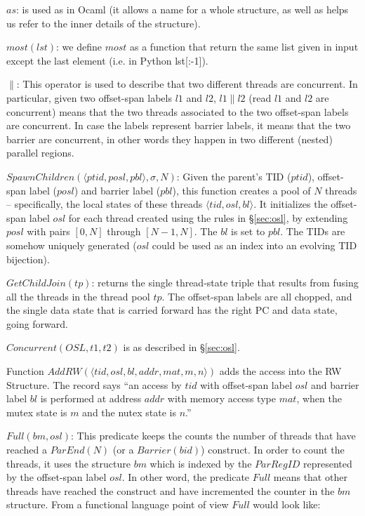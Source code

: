 \begin{compactitem}
\item $as$: is used as in Ocaml (it allows a name for a whole structure, as
  well as helps us refer to the inner details of the structure).
\item $most(lst)$: we define $most$ as a function that return the same list
  given in input except the last element (i.e. in Python lst[:-1]).
\item $\parallel$: This operator is used to describe that two different
  threads are concurrent.
  In particular, given two offset-span labels $l1$ and $l2$, $l1 \parallel l2$
  (read $l1$ and $l2$ are concurrent) means that the two threads associated to
  the two offset-span labels are concurrent.
  In case the labels represent barrier labels, it means that the two barrier
  are concurrent, in other words they happen in two different (nested)
  parallel regions.
\item $SpawnChildren(\langle ptid, posl, pbl \rangle, \sigma, N)$: Given the
  parent's TID ($ptid$), offset-span label ($posl$) and barrier label ($pbl$),
  this function creates a pool of $N$ threads -- specifically, the local
  states of these threads $\langle tid, osl, bl \rangle$.
  It initializes the offset-span label $osl$ for each thread created using the
  rules in \S\ref{sec:osl}, by extending $posl$ with pairs $[0,N]$ through
  $[N-1,N]$.
  The $bl$ is set to $pbl$.
  The TIDs are somehow uniquely generated ($osl$ could be used as an index
  into an evolving TID bijection).
\item $GetChildJoin(tp)$: returns the single thread-state triple that results
  from fusing all the threads in the thread pool $tp$.
  The offset-span labels are all chopped, and the single data state that is
  carried forward has the right PC and data state, going forward.
\item $Concurrent(OSL, t1, t2)$ is as described in \S\ref{sec:osl}.
\item Function $AddRW(\langle tid, osl, bl, addr, mat, m, n \rangle)$ adds the
  access into the RW Structure.
  The record says ``an access by $tid$ with offset-span label $osl$ and
  barrier label $bl$ is performed at address $addr$ with memory access type
  $mat$, when the mutex state is $m$ and the nutex state is $n$.''
\item $Full(bm, osl)$: This predicate keeps the counts the number of threads
  that have reached a $ParEnd(N)$ (or a $Barrier(bid)$) construct.
  In order to count the threads, it uses the structure $bm$ which is indexed
  by the $ParRegID$ represented by the offset-span label $osl$.
  In other word, the predicate $Full$ means that other threads have reached
  the construct and have incremented the counter in the $bm$ structure.
  From a functional language point of view $Full$ would look like:


\end{compactitem}
